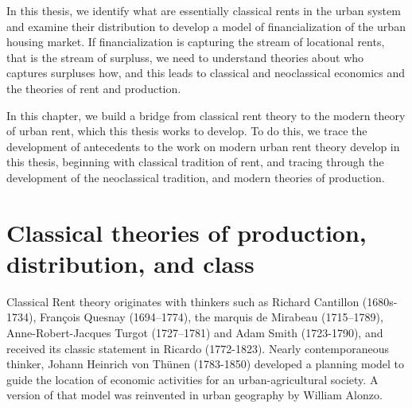 In this thesis, we identify what are essentially \glspl{classical rent} in the urban system and examine their distribution to develop a model of financialization of the urban housing market.
If financialization is capturing the stream of \glspl{locational rent}, that is the stream of \glspl{surplus}, we need to understand theories about who captures surpluses how, and this leads to classical and neoclassical economics and the theories of rent and production.

In this chapter, we build a bridge from \gls{classical rent theory} to the modern theory of urban rent, which this thesis works to develop. 
To do this, we trace the development of antecedents to the work on modern urban rent theory develop in this thesis, beginning with classical tradition of rent, and tracing through the development of the neoclassical tradition, and modern theories of production. 




 
\section{Classical theories of production, distribution, and class}
Classical Rent theory originates with  thinkers such as Richard Cantillon (1680s-1734), 
Fran\c{c}ois Quesnay (1694–1774), the marquis de Mirabeau (1715–1789), Anne-Robert-Jacques
Turgot (1727--1781) and 
Adam Smith (1723-1790), and received its classic statement
in Ricardo (1772-1823). Nearly contemporaneous thinker, 
Johann Heinrich von Th\"unen (1783-1850) developed a planning model to guide the location of economic activities for an urban-agricultural society. A version of that model was reinvented in urban geography by William Alonzo.

